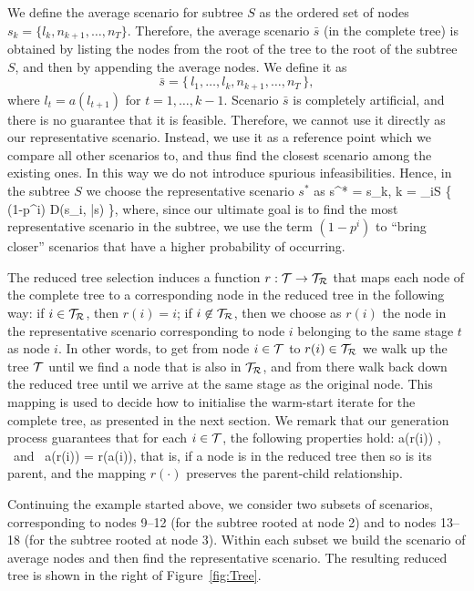 We define the average scenario for subtree $S$ as the ordered
set of nodes $s_k = \{ l_k, n_{k+1}, \ldots, n_T \}$.
Therefore, the average scenario $\bar s$ (in the complete tree) 
is obtained by listing the 
nodes from the root of the tree to the root of the subtree $S$, and 
then by appending the average nodes. We define it as
\[
\bar s = \{\, l_1, \ldots, l_k, n_{k+1}, \ldots, n_T \,\},
\]
where $l_t = a(l_{t+1})$ for $t = 1,\ldots, k-1$.
Scenario $\bar{s}$ is completely artificial, and there is no guarantee 
that it is feasible. Therefore, we cannot use it directly as our 
representative scenario. Instead, we use it as a reference point
which we compare all other scenarios to, and thus find the closest scenario 
among the existing ones. In this way we do not introduce spurious 
infeasibilities. Hence, in the subtree $S$ we choose the 
representative scenario $s^*$ as 
%
\be  \label{repScenario}
   s^* = s_k, \quad k = \arg\min_{i\in S} \{ (1-p^i) D(s_i, \bar{s}) \},
\ee
%
where, since our ultimate goal is to find the most representative scenario in 
the subtree, we use the term $(1-p^i)$ to ``bring closer'' scenarios 
that have a higher probability of occurring.

The reduced tree selection induces a function $r: \mathcal{T} \to \mathcal{T}_\mathcal{R}$ 
that maps each node of the complete tree to a corresponding node 
in the reduced tree in the following way: if $i \in \mathcal{T}_\mathcal{R}$, then
$r(i) = i$; if $i\not\in \mathcal{T}_\mathcal{R}$, then we choose as $r(i)$ the node in 
the representative scenario corresponding to node $i$ belonging to the
same stage $t$ as node $i$. In other words, to get from node
$i\in\mathcal{T}$ to $r(i)\in\mathcal{T}_\mathcal{R}$ we walk up the tree $\mathcal{T}$ until we
find a node that is also in $\mathcal{T}_\mathcal{R}$, and from there walk back down
the reduced tree until we arrive at the same stage as the original node.
This mapping is used to decide how to initialise 
the warm-start iterate for the complete tree, as presented in the
next section. We remark that our generation process guarantees
that for each $i \in \mathcal{T}$, the following properties hold:
\be  \label{eq:ReducedTreeProperties}
  a(r(i)) \in \Rtree, \quad \mbox{ and } \quad a(r(i)) = r(a(i)),
\ee
that is, if a node is in the reduced tree then so is its parent, and the
mapping $r(\cdot)$ preserves the parent-child relationship. 

Continuing the example started above, we consider two subsets of 
scenarios, corresponding to nodes 9--12 (for the subtree rooted at 
node 2) and to nodes 13--18 (for the subtree rooted at node 3). Within 
each subset we build the scenario of average nodes and then find the 
representative scenario.
The resulting reduced tree is shown in the right of Figure~\ref{fig:Tree}.

